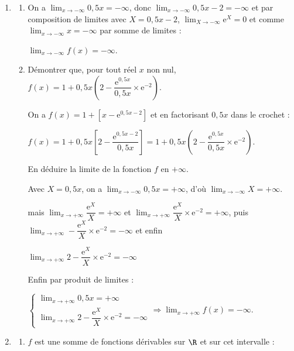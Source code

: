 \begin{enumerate}
\item 
	\begin{enumerate}
		\item 
On a $\displaystyle\lim_{x \to - \infty} 0,5x = - \infty$, donc $\displaystyle\lim_{x \to - \infty} 0,5x - 2 = - \infty$ et par composition de limites avec $X = 0,5x - 2$, $\displaystyle\lim_{X \to - \infty} \text{e}^X = 0$ et comme $\displaystyle\lim_{x \to - \infty} x = - \infty$ par somme de limites :

$\displaystyle\lim_{x \to - \infty} f(x) = - \infty$.
		\item Démontrer que, pour tout réel $x$ non nul, $f(x) = 1+ 0,5x\left(2 - \dfrac{\text{e}^{0,5x}}{0,5x} \times \text{e}^{-2}\right)$.

On a $f(x) = 1 + \left[x - \text{e}^{0,5x - 2}\right]$ et en factorisant $0,5x$ dans le crochet :

$f(x)  = 1 + 0,5x\left[2 - \dfrac{\text{e}^{0,5x - 2}}{0,5x} \right] =  1+ 0,5x\left(2 - \dfrac{\text{e}^{0,5x}}{0,5x} \times \text{e}^{-2}\right)$.

En déduire la limite de la fonction $f$ en $+\infty$.

Avec $X = 0,5x$, on a $\displaystyle\lim_{x \to - \infty}0,5x = + \infty$, d'où $\displaystyle\lim_{x \to - \infty} X = + \infty$.

mais $\displaystyle\lim_{x \to + \infty}\dfrac{\text{e}^X}{X} = + \infty$ et $\displaystyle\lim_{x \to + \infty}\dfrac{\text{e}^X}{X} \times \text{e}^{-2} = + \infty$, puis $\displaystyle\lim_{x \to + \infty}-\dfrac{\text{e}^X}{X} \times \text{e}^{-2} = - \infty$ et enfin

$\displaystyle\lim_{x \to + \infty}2 -\dfrac{\text{e}^X}{X} \times \text{e}^{-2} = - \infty$

Enfin par produit de limites :

$\left\{\begin{array}{l}
\displaystyle\lim_{x \to + \infty} 0,5x = + \infty\\
\displaystyle\lim_{x \to + \infty}2 -\dfrac{\text{e}^X}{X} \times \text{e}^{-2} = - \infty
\end{array}\right. \Rightarrow \displaystyle\lim_{x \to + \infty}f(x) = - \infty$.

	\end{enumerate}
\item 
	\begin{enumerate}
		\item 
$f$ est une somme de fonctions dérivables sur $\R$ et sur cet intervalle :


\end{enumerate}
\end{enumerate}
